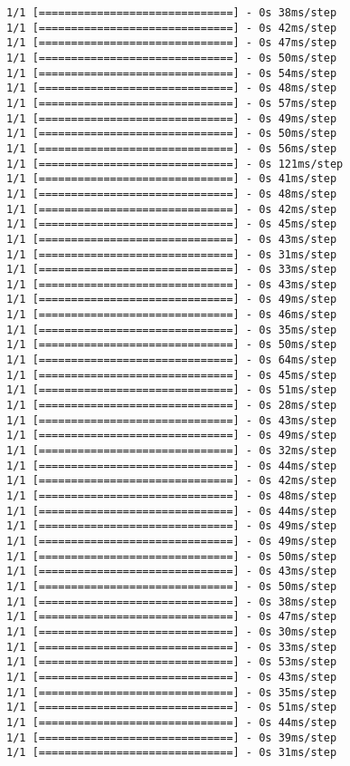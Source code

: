 \documentclass[11pt]{article}
\begin{document}
\begin{Verbatim}[commandchars=\\\{\}]
1/1 [==============================] - 0s 38ms/step
1/1 [==============================] - 0s 42ms/step
1/1 [==============================] - 0s 47ms/step
1/1 [==============================] - 0s 50ms/step
1/1 [==============================] - 0s 54ms/step
1/1 [==============================] - 0s 48ms/step
1/1 [==============================] - 0s 57ms/step
1/1 [==============================] - 0s 49ms/step
1/1 [==============================] - 0s 50ms/step
1/1 [==============================] - 0s 56ms/step
1/1 [==============================] - 0s 121ms/step
1/1 [==============================] - 0s 41ms/step
1/1 [==============================] - 0s 48ms/step
1/1 [==============================] - 0s 42ms/step
1/1 [==============================] - 0s 45ms/step
1/1 [==============================] - 0s 43ms/step
1/1 [==============================] - 0s 31ms/step
1/1 [==============================] - 0s 33ms/step
1/1 [==============================] - 0s 43ms/step
1/1 [==============================] - 0s 49ms/step
1/1 [==============================] - 0s 46ms/step
1/1 [==============================] - 0s 35ms/step
1/1 [==============================] - 0s 50ms/step
1/1 [==============================] - 0s 64ms/step
1/1 [==============================] - 0s 45ms/step
1/1 [==============================] - 0s 51ms/step
1/1 [==============================] - 0s 28ms/step
1/1 [==============================] - 0s 43ms/step
1/1 [==============================] - 0s 49ms/step
1/1 [==============================] - 0s 32ms/step
1/1 [==============================] - 0s 44ms/step
1/1 [==============================] - 0s 42ms/step
1/1 [==============================] - 0s 48ms/step
1/1 [==============================] - 0s 44ms/step
1/1 [==============================] - 0s 49ms/step
1/1 [==============================] - 0s 49ms/step
1/1 [==============================] - 0s 50ms/step
1/1 [==============================] - 0s 43ms/step
1/1 [==============================] - 0s 50ms/step
1/1 [==============================] - 0s 38ms/step
1/1 [==============================] - 0s 47ms/step
1/1 [==============================] - 0s 30ms/step
1/1 [==============================] - 0s 33ms/step
1/1 [==============================] - 0s 53ms/step
1/1 [==============================] - 0s 43ms/step
1/1 [==============================] - 0s 35ms/step
1/1 [==============================] - 0s 51ms/step
1/1 [==============================] - 0s 44ms/step
1/1 [==============================] - 0s 39ms/step
1/1 [==============================] - 0s 31ms/step

\end{Verbatim}
\end{document}
